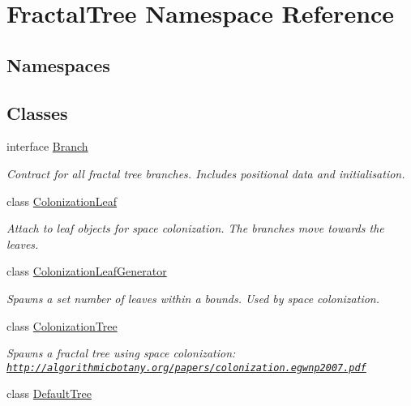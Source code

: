 \hypertarget{namespace_fractal_tree}{}\section{Fractal\+Tree Namespace Reference}
\label{namespace_fractal_tree}
\subsection*{Namespaces}
\begin{DoxyCompactItemize}
\end{DoxyCompactItemize}
\subsection*{Classes}
\begin{DoxyCompactItemize}
\item 
interface \hyperlink{interface_fractal_tree_1_1_branch}{Branch}
\begin{DoxyCompactList}\small\item\em Contract for all fractal tree branches. Includes positional data and initialisation. \end{DoxyCompactList}\item 
class \hyperlink{class_fractal_tree_1_1_colonization_leaf}{Colonization\+Leaf}
\begin{DoxyCompactList}\small\item\em Attach to leaf objects for space colonization. The branches move towards the leaves. \end{DoxyCompactList}\item 
class \hyperlink{class_fractal_tree_1_1_colonization_leaf_generator}{Colonization\+Leaf\+Generator}
\begin{DoxyCompactList}\small\item\em Spawns a set number of leaves within a bounds. Used by space colonization. \end{DoxyCompactList}\item 
class \hyperlink{class_fractal_tree_1_1_colonization_tree}{Colonization\+Tree}
\begin{DoxyCompactList}\small\item\em Spawns a fractal tree using space colonization\+: \href{http://algorithmicbotany.org/papers/colonization.egwnp2007.pdf}{\tt http\+://algorithmicbotany.\+org/papers/colonization.\+egwnp2007.\+pdf} \end{DoxyCompactList}\item 
class \hyperlink{class_fractal_tree_1_1_default_tree}{Default\+Tree}

\end{DoxyCompactItemize}
